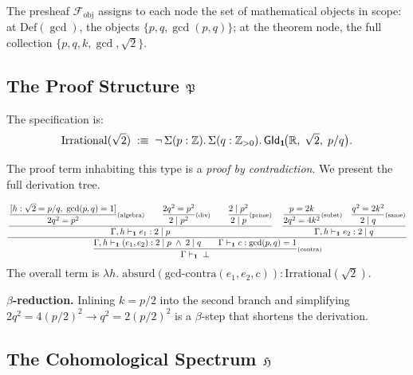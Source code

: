The presheaf $\mathcal{F}_{\mathrm{obj}}$ assigns to each node the
set of mathematical objects in scope: at $\text{Def}(\gcd)$, the
objects $\{p,q,\gcd(p,q)\}$; at the theorem node, the full
collection $\{p,q,k,\gcd,\sqrt{2}\}$.

\subsection{The Proof Structure $\mathfrak{P}$}

\begin{construction}
The specification is:
\[
  \mathrm{Irrational}(\sqrt{2})
  \;:\equiv\;
  \neg\,\Sigma(p:\mathbb{Z}).\,\Sigma(q:\mathbb{Z}_{>0}).\,
  \mathsf{GId}_{\mathbf{1}}\!\bigl(\mathbb{R},\;\sqrt{2},\;p/q\bigr).
\]
\end{construction}

The proof term inhabiting this type is a \emph{proof by
contradiction}.  We present the full derivation tree.

\begin{construction}
\label{con:sqrt2-proof}
\[
\dfrac{
  \dfrac{
    \dfrac{
      [h:\sqrt{2}=p/q,\;\gcd(p,q)=1]
    }{
      2q^2=p^2
    }\text{\scriptsize(algebra)}
    \qquad
    \dfrac{
      2q^2=p^2
    }{
      2\mid p^2
    }\text{\scriptsize(div)}
    \qquad
    \dfrac{
      2\mid p^2
    }{
      2\mid p
    }\text{\scriptsize(prime)}
  }{
    \Gamma,h\vdash_{\mathbf{1}} e_1:2\mid p
  }
  \quad
  \dfrac{
    \dfrac{
      p=2k
    }{
      2q^2=4k^2
    }\text{\scriptsize(subst)}
    \quad
    \dfrac{
      q^2=2k^2
    }{
      2\mid q
    }\text{\scriptsize(same)}
  }{
    \Gamma,h\vdash_{\mathbf{1}} e_2:2\mid q
  }
}{
  \dfrac{
    \Gamma,h\vdash_{\mathbf{1}} (e_1,e_2):2\mid p\;\wedge\;2\mid q
    \qquad
    \Gamma\vdash_{\mathbf{1}} c:\gcd(p,q)=1
  }{
    \Gamma\vdash_{\mathbf{1}}\;\bot
  }\text{\scriptsize(contra)}
}
\]
The overall term is
$\lambda h.\;\mathrm{absurd}(\mathrm{gcd\text{-}contra}(e_1,e_2,c))
 :\mathrm{Irrational}(\sqrt{2})$.
\end{construction}

\textbf{$\beta$-reduction.}\quad
Inlining $k=p/2$ into the second branch and simplifying
$2q^2=4(p/2)^2\longrightarrow q^2=2(p/2)^2$ is a $\beta$-step
that shortens the derivation.

\subsection{The Cohomological Spectrum $\mathfrak{H}$}


